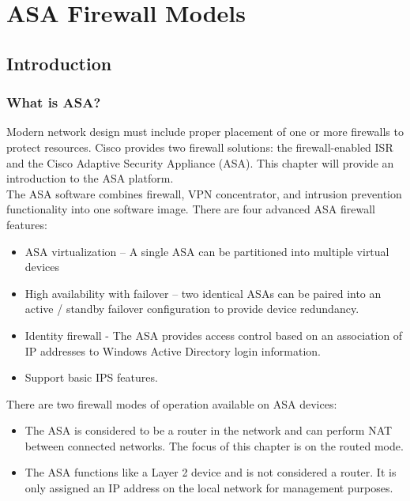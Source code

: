 \chapter{ASA Firewall Models}

\section{Introduction}

\subsection{What is ASA?}

Modern network design must include proper placement of one or more firewalls to protect resources. Cisco provides two firewall solutions: the firewall-enabled ISR and the Cisco Adaptive Security Appliance (ASA). This chapter will provide an introduction to the ASA platform.\\

The ASA software combines firewall, VPN concentrator, and intrusion prevention functionality into one software image. There are four advanced ASA firewall features:

\begin{itemize}
\item ASA virtualization -- A single ASA can be partitioned into multiple virtual devices
\item High availability with failover -- two identical ASAs can be paired into an active / standby failover configuration to provide device redundancy.
\item Identity firewall - The ASA provides access control based on an association of IP addresses to Windows Active Directory login information.
\item Support basic IPS features.
\end{itemize}

There are two firewall modes of operation available on ASA devices:

\begin{itemize}
\item The ASA is considered to be a router in the network and can perform NAT between connected networks. The focus of this chapter is on the routed mode.
\item The ASA functions like a Layer 2 device and is not considered a router. It is only assigned an IP address on the local network for management purposes.
\end{itemize}

